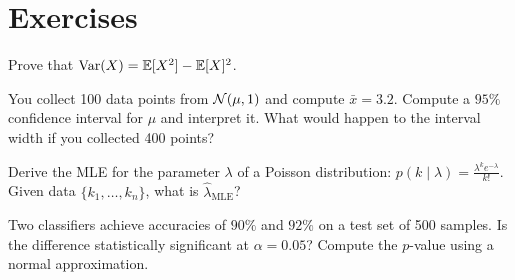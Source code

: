 \section{Exercises}

\begin{exercise}
	Prove that $\operatorname{Var}(X) = \mathbb{E}[X^2] - \mathbb{E}[X]^2$.
\end{exercise}

\begin{exercise}
	You collect 100 data points from $\mathcal{N}(\mu, 1)$ and compute $\bar{x} = 3.2$. Compute a $95\%$ confidence interval for $\mu$ and interpret it. What would happen to the interval width if you collected 400 points?
\end{exercise}

\begin{exercise}
	Derive the MLE for the parameter $\lambda$ of a Poisson distribution: $p(k \mid \lambda) = \frac{\lambda^k e^{-\lambda}}{k!}$. Given data $\{k_1, \dots, k_n\}$, what is $\hat{\lambda}_{\text{MLE}}$?
\end{exercise}

\begin{exercise}
	Two classifiers achieve accuracies of $90\%$ and $92\%$ on a test set of 500 samples. Is the difference statistically significant at $\alpha = 0.05$? Compute the $p$-value using a normal approximation.
\end{exercise}
